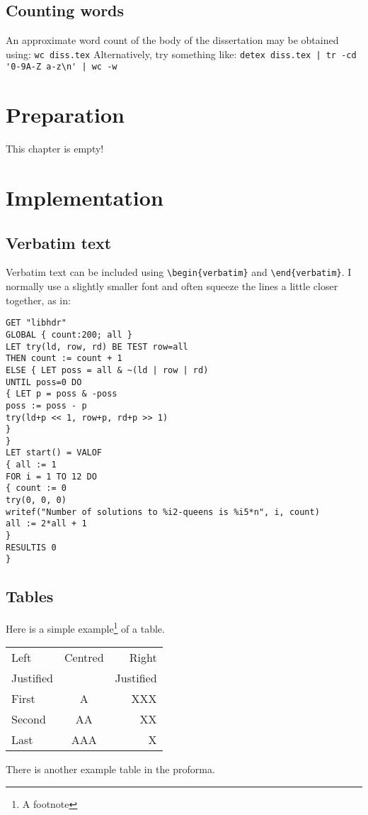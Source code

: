 \documentclass[12pt,a4paper,twoside,openright]{report}
\renewcommand{\baselinestretch}{1.1} %
\begin{document}
\section{Counting words}
An approximate word count of the body of the dissertation may be
obtained using:
\texttt{wc diss.tex}
\noindent
Alternatively, try something like:
\verb/detex diss.tex | tr -cd '0-9A-Z a-z\n' | wc -w/
\chapter{Preparation}
This chapter is empty!
\chapter{Implementation}
\section{Verbatim text}
Verbatim text can be included using \verb|\begin{verbatim}| and
\verb|\end{verbatim}|. I normally use a slightly smaller font and
often squeeze the lines a little closer together, as in:
{\renewcommand{\baselinestretch}{0.8}\small
\begin{verbatim}
GET "libhdr"
GLOBAL { count:200; all }
LET try(ld, row, rd) BE TEST row=all
THEN count := count + 1
ELSE { LET poss = all & ~(ld | row | rd)
UNTIL poss=0 DO
{ LET p = poss & -poss
poss := poss - p
try(ld+p << 1, row+p, rd+p >> 1)
}
}
LET start() = VALOF
{ all := 1
FOR i = 1 TO 12 DO
{ count := 0
try(0, 0, 0)
writef("Number of solutions to %i2-queens is %i5*n", i, count)
all := 2*all + 1
}
RESULTIS 0
}
\end{verbatim}
}
\section{Tables}
\begin{samepage}
Here is a simple example\footnote{A footnote} of a table.
\begin{center}
\begin{tabular}{l|c|r}
Left & Centred & Right \\
Justified & & Justified \\[3mm]
First & A & XXX \\
Second & AA & XX \\
Last & AAA & X \\
\end{tabular}
\end{center}
\noindent
There is another example table in the proforma.
\end{samepage}
\end{document}
